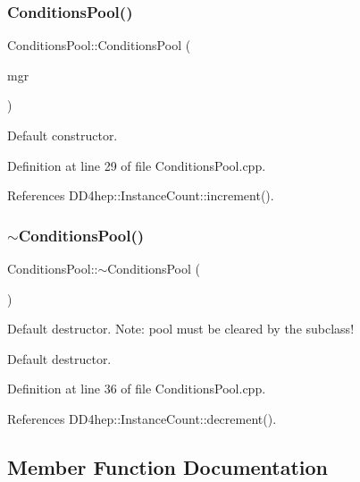 \subsubsection{\texorpdfstring{Conditions\+Pool()}{ConditionsPool()}}
{\footnotesize\ttfamily Conditions\+Pool\+::\+Conditions\+Pool (\begin{DoxyParamCaption}\item[{\hyperlink{class_d_d4hep_1_1_conditions_1_1_conditions_manager}{Conditions\+Manager}}]{mgr }\end{DoxyParamCaption})}



Default constructor. 



Definition at line 29 of file Conditions\+Pool.\+cpp.



References D\+D4hep\+::\+Instance\+Count\+::increment().

\hypertarget{class_d_d4hep_1_1_conditions_1_1_conditions_pool_a33a9ee6f763731cf1fd02b8a102b5217}{}\label{class_d_d4hep_1_1_conditions_1_1_conditions_pool_a33a9ee6f763731cf1fd02b8a102b5217} 
\subsubsection{\texorpdfstring{$\sim$\+Conditions\+Pool()}{~ConditionsPool()}}
{\footnotesize\ttfamily Conditions\+Pool\+::$\sim$\+Conditions\+Pool (\begin{DoxyParamCaption}{ }\end{DoxyParamCaption})\hspace{0.3cm}{\ttfamily [virtual]}}



Default destructor. Note\+: pool must be cleared by the subclass! 

Default destructor. 

Definition at line 36 of file Conditions\+Pool.\+cpp.



References D\+D4hep\+::\+Instance\+Count\+::decrement().



\subsection{Member Function Documentation}
\hypertarget{class_d_d4hep_1_1_conditions_1_1_conditions_pool_aaa515e23b412a5da244f6c4e6bf13220}{}\label{class_d_d4hep_1_1_conditions_1_1_conditions_pool_aaa515e23b412a5da244f6c4e6bf13220} 
